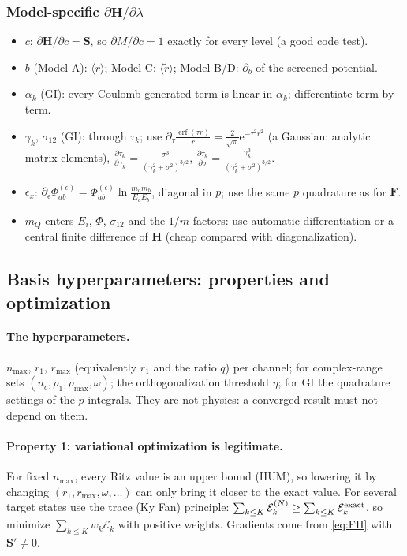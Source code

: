 \documentclass[11pt,a4paper]{article}
\numberwithin{equation}{section}
\theoremstyle{definition}
\theoremstyle{plain}
\theoremstyle{remark}
\numberwithin{algorithm}{section}
\newcommand{\ee}{\mathrm{e}}
\newcommand{\erf}{\operatorname{erf}}
\newcommand{\mH}{\mathbf H}
\newcommand{\mS}{\mathbf S}
\begin{document}
\subsubsection{Model-specific $\partial\mH/\partial\lambda$}
\begin{itemize}[leftmargin=1.3em,itemsep=2pt]
\item $c$: $\partial\mH/\partial c=\mS$, so $\partial M/\partial c=1$ exactly for every level (a good code test).
\item $b$ (Model A): $\langle r\rangle$; Model C: $\langle\tilde r\rangle$; Model B/D: $\partial_b$ of the screened potential.
\item $\alpha_k$ (GI): every Coulomb-generated term is linear in $\alpha_k$; differentiate term by term.
\item $\gamma_k$, $\sigma_{12}$ (GI): through $\tau_k$; use $\partial_\tau\frac{\erf(\tau r)}r=\frac{2}{\sqrt\pi}\ee^{-\tau^2r^2}$ (a Gaussian: analytic matrix elements), $\frac{\partial\tau_k}{\partial\gamma_k}=\frac{\sigma^3}{(\gamma_k^2+\sigma^2)^{3/2}}$, $\frac{\partial\tau_k}{\partial\sigma}=\frac{\gamma_k^3}{(\gamma_k^2+\sigma^2)^{3/2}}$.
\item $\epsilon_x$: $\partial_\epsilon\Phi^{(\epsilon)}_{ab}=\Phi^{(\epsilon)}_{ab}\ln\frac{m_am_b}{E_aE_b}$, diagonal in $p$; use the same $p$ quadrature as for $\mathbf F$.
\item $m_Q$ enters $E_i$, $\Phi$, $\sigma_{12}$ and the $1/m$ factors: use automatic differentiation or a central finite difference of $\mH$ (cheap compared with diagonalization).
\end{itemize}

\subsection{Basis hyperparameters: properties and optimization}\label{sec:hyper}
\paragraph{The hyperparameters.} $n_{\max}$, $r_1$, $r_{\max}$ (equivalently $r_1$ and the ratio $q$) per channel; for complex-range sets $(n_c,\rho_1,\rho_{\max},\omega)$; the orthogonalization threshold $\eta$; for GI the quadrature settings of the $p$ integrals. They are not physics: a converged result must not depend on them.

\paragraph{Property 1: variational optimization is legitimate.} For fixed $n_{\max}$, every Ritz value is an upper bound (HUM), so lowering it by changing $(r_1,r_{\max},\omega,\dots)$ can only bring it closer to the exact value. For several target states use the trace (Ky Fan) principle: $\sum_{k\le K}\mathcal E_k^{(N)}\ge\sum_{k\le K}\mathcal E_k^{\rm exact}$, so minimize $\sum_{k\le K}w_k\mathcal E_k$ with positive weights. Gradients come from \eqref{eq:FH} with $\mS'\ne0$.
\end{document}
